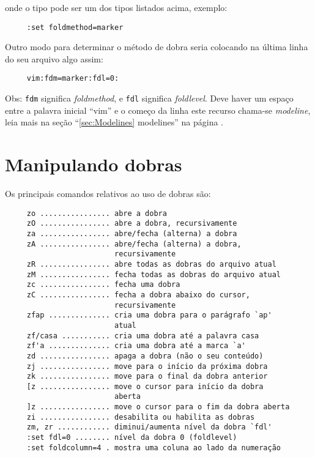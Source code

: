 onde o tipo pode ser um dos tipos listados acima, exemplo:
\begin{verbatim}
     :set foldmethod=marker
\end{verbatim}

Outro modo para determinar o método de dobra seria colocando na última
linha do seu arquivo algo assim:
\begin{verbatim}
     vim:fdm=marker:fdl=0:
\end{verbatim}

Obs: \verb|fdm| significa {\em foldmethod}, e \verb|fdl| significa
{\em foldlevel}. Deve haver um espaço entre a palavra inicial ``vim'' e o
começo da linha este recurso chama-se {\em modeline}, leia mais na seção
``\ref{sec:Modelines} modelines'' na página \pageref{sec:Modelines}.

\section{Manipulando dobras }
\label{Manipulando dobras }

Os principais comandos relativos ao uso de dobras são:
\begin{verbatim}
     zo ................ abre a dobra
     zO ................ abre a dobra, recursivamente
     za ................ abre/fecha (alterna) a dobra
     zA ................ abre/fecha (alterna) a dobra,
                         recursivamente
     zR ................ abre todas as dobras do arquivo atual
     zM ................ fecha todas as dobras do arquivo atual
     zc ................ fecha uma dobra
     zC ................ fecha a dobra abaixo do cursor, 
                         recursivamente
     zfap .............. cria uma dobra para o parágrafo `ap'
                         atual
     zf/casa ........... cria uma dobra até a palavra casa
     zf'a .............. cria uma dobra até a marca `a'
     zd ................ apaga a dobra (não o seu conteúdo)
     zj ................ move para o início da próxima dobra
     zk ................ move para o final da dobra anterior
     [z ................ move o cursor para início da dobra
                         aberta
     ]z ................ move o cursor para o fim da dobra aberta
     zi ................ desabilita ou habilita as dobras
     zm, zr ............ diminui/aumenta nível da dobra `fdl'
     :set fdl=0 ........ nível da dobra 0 (foldlevel)
     :set foldcolumn=4 . mostra uma coluna ao lado da numeração
\end{verbatim}

